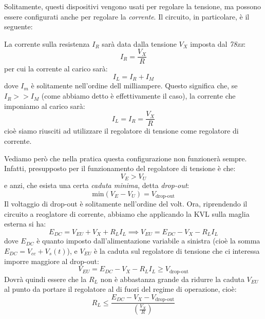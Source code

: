 \documentclass[a4paper,11pt]{article}
\begin{document}
Solitamente, questi dispositivi vengono usati per regolare la tensione, ma possono essere configurati anche per regolare la \textit{corrente}.
Il circuito, in particolare, è il seguente:
\begin{center}
\end{center}

La corrente sulla resistenza $I_R$ sarà data dalla tensione $V_X$ imposta dal \textit{78xx}:
$$
I_R = \frac{V_X}{R}
$$
per cui la corrente al carico sarà:
$$
I_L = I_R + I_M
$$
dove $I_m$ è solitamente nell'ordine dell milliampere. Questo significa che, se $I_R >> I_M$ (come abbiamo detto è effettivamente il caso), la corrente che imponiamo al carico sarà:
$$
I_L = I_R = \frac{V_X}{R}
$$
cioè siamo riusciti ad utilizzare il regolatore di tensione come regolatore di corrente.

Vediamo però che nella pratica questa configurazione non funzionerà sempre. Infatti, presupposto per il funzionamento del regolatore di tensione è che:
$$
V_E > V_U
$$
e anzi, che esista una certa \textit{caduta minima}, detta \textit{drop-out}:
$$
\mathrm{min} \left(V_E - V_U\right) = V_{\text{drop-out}}
$$
Il voltaggio di drop-out è solitamente nell'ordine del volt.
Ora, riprendendo il circuito a reoglatore di corrente, abbiamo che applicando la KVL sulla maglia esterna si ha:
$$
E_{DC} = V_{EU} + V_X + R_L I_L \implies V_{EU} = E_{DC} - V_X - R_L I_L
$$
dove $E_{DC}$ è quanto imposto dall'alimentazione variabile a sinistra (cioè la somma $E_{DC} = V_{cc} + V_s(t)$), e $V_{EU}$ è la caduta sul regolatore di tensione che ci interessa imporre maggiore al drop-out:
$$
V_{EU} = E_{DC} - V_X - R_L I_L \geq V_{\text{drop-out}}
$$
Dovrà quindi essere che la $R_L$ non è abbastanza grande da ridurre la caduta $V_{EU}$ al punto da portare il regolatore al di fuori del regime di operazione, cioè:
$$
R_L \leq \frac{E_{DC} - V_X - V_{\text{drop-out}}}{\left(\frac{V_X}{R}\right)}
$$
\end{document}

